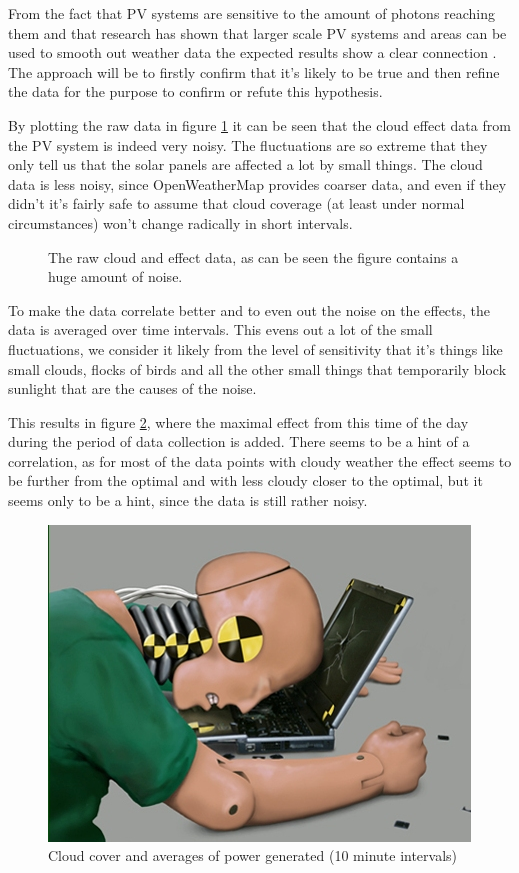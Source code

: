 From the fact that PV systems are sensitive to the amount of photons
reaching them and that research has shown that larger scale PV systems
and areas can be used to smooth out weather data the expected results
show a clear connection \citep{southafrica, cloudTrack, photovoltaic}.
The approach will be to firstly confirm that it's likely to be true
and then refine the data for the purpose to confirm or refute this
hypothesis.

By plotting the raw data in figure \ref{fig:noise} it can be seen that
the cloud effect data from the PV system is indeed very noisy.  The
fluctuations are so extreme that they only tell us that the solar
panels are affected a lot by small things.  The cloud data is less
noisy, since OpenWeatherMap provides coarser data, and even if they
didn't it's fairly safe to assume that cloud coverage (at least under
normal circumstances) won't change radically in short intervals.

\begin{figure}
  \centering
  
  \caption{The raw cloud and effect data, as can be seen the figure
    contains a huge amount of noise.}
  \label{fig:noise}
\end{figure}

To make the data correlate better and to even out the noise on the
effects, the data is averaged over time intervals.  This evens out a
lot of the small fluctuations, we consider it likely from the level of
sensitivity that it's things like small clouds, flocks of birds and
all the other small things that temporarily block sunlight that are
the causes of the noise.

This results in figure \ref{fig:cloudsAndPower}, where the maximal
effect from this time of the day during the period of data collection
is added.  There seems to be a hint of a correlation, as for most of
the data points with cloudy weather the effect seems to be further
from the optimal and with less cloudy closer to the optimal, but it
seems only to be a hint, since the data is still rather noisy.

\begin{figure}
  \centering
  \includegraphics{dummy.jpg}
  \caption{Cloud cover and averages of power generated (10 minute
    intervals)}
  \label{fig:cloudsAndPower}
\end{figure}

